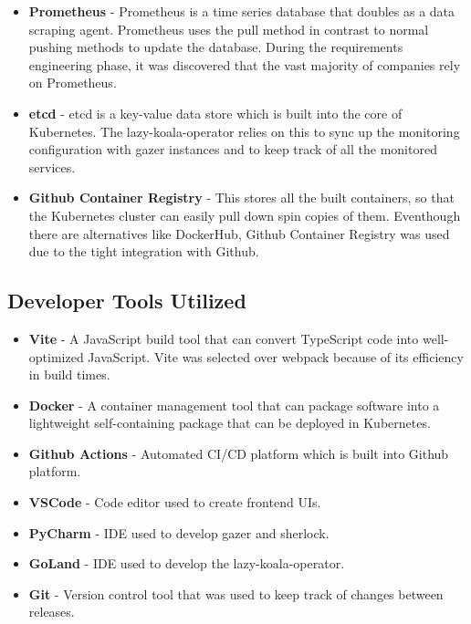 \begin{itemize}[noitemsep,nolistsep] 
    \item \textbf{Prometheus} - Prometheus is a time series database that doubles as a data scraping agent. Prometheus uses the pull method in contrast to normal pushing methods to update the database. During the requirements engineering phase, it was discovered that the vast majority of companies rely on Prometheus. %
    \item \textbf{etcd} - etcd is a key-value data store which is built into the core of Kubernetes. The \ac{lazy-koala-operator} relies on this to sync up the monitoring configuration with \ac{gazer} instances and to keep track of all the monitored services.
    \item \textbf{Github Container Registry} - This stores all the built containers, so that the Kubernetes cluster can easily pull down spin copies of them. Eventhough there are alternatives like DockerHub, Github Container Registry was used due to the tight integration with Github.  
\end{itemize}

\subsection{Developer Tools Utilized}
\begin{itemize}[noitemsep,nolistsep] 
    \item \textbf{Vite} - A JavaScript build tool that can convert TypeScript code into well-optimized JavaScript. Vite was selected over webpack because of its efficiency in build times.
    \item \textbf{Docker} - A container management tool that can package software into a lightweight self-containing package that can be deployed in Kubernetes.
    \item \textbf{Github Actions} - Automated CI/CD platform which is built into Github platform.
    \item \textbf{VSCode} - Code editor used to create frontend UIs.
    \item \textbf{PyCharm} - IDE used to develop \ac{gazer} and \ac{sherlock}.
    \item \textbf{GoLand} - IDE used to develop the \ac{lazy-koala-operator}.
    \item \textbf{Git} - Version control tool that was used to keep track of changes between releases.
\end{itemize}

